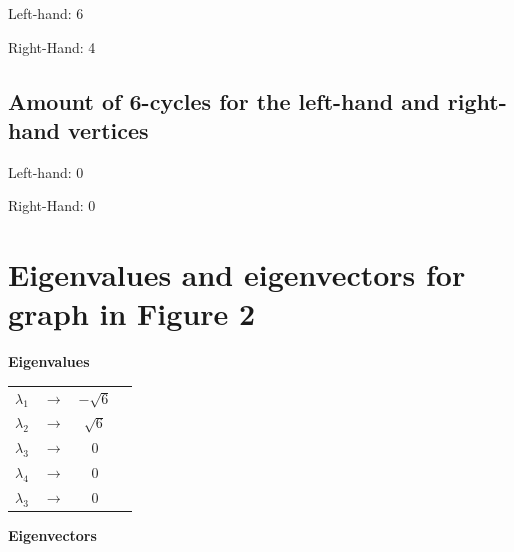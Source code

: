 \documentclass[12pt]{scrreprt}
\begin{document}
\centerline{Left-hand: 6}
\centerline{Right-Hand: 4}

\subsection{Amount of 6-cycles for the left-hand and right-hand vertices} 

\centerline{Left-hand: 0}
\centerline{Right-Hand: 0}

\pagebreak

\section{Eigenvalues and eigenvectors for graph in Figure 2}

  \begin{center}
  \textbf{Eigenvalues}
  \end{center}

  \begin{center}
  \begin{tabular}{ c c c p{5cm} }
    $\lambda_1$ & $\rightarrow$ & $-\sqrt{6}$ \\        
    $\lambda_2$ & $\rightarrow$ & $\sqrt{6}$ \\
    $\lambda_3$ & $\rightarrow$ & 0 \\
    $\lambda_4$ & $\rightarrow$ & 0 \\
    $\lambda_3$ & $\rightarrow$ & 0 \\
  \end{tabular}
  \end{center}

  \begin{center}
  \textbf{Eigenvectors}
  \end{center}
\end{document}
